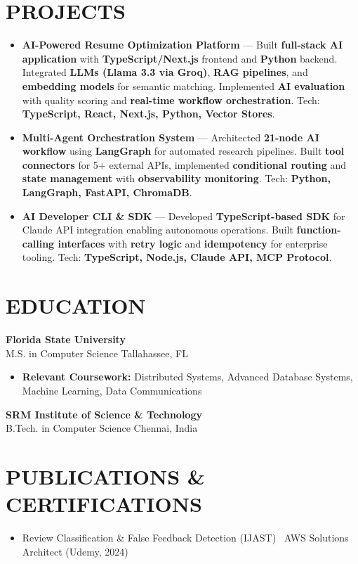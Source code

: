 \documentclass[letterpaper,10pt]{article}
\newcommand{\resumeItem}[1]{\item\small #1}
\newcommand{\resumeSubheading}[4]{
  \vspace{6pt}
  \noindent
  \textbf{#1} \hfill {\footnotesize #2} \\
  [-1pt]
  \noindent
  \small #3 \hfill {\small #4}
  \vspace{3pt}
}
\newcommand{\resumeItemsStart}{\vspace{-2pt}\begin{itemize}}
\newcommand{\resumeItemsEnd}{\end{itemize}\vspace{6pt}}
\begin{document}
\section{\textcolor{metablue}{PROJECTS}}
\vspace{-8pt}
\begin{tcolorbox}[colback=white,colframe=metablue,boxrule=0.8pt,arc=2pt,left=4pt,right=4pt,top=2pt,bottom=2pt,before skip=0pt]
\begin{itemize}
\resumeItem{\textbf{AI-Powered Resume Optimization Platform} --- Built \textbf{full-stack AI application} with \textbf{TypeScript/Next.js} frontend and \textbf{Python} backend. Integrated \textbf{LLMs (Llama 3.3 via Groq)}, \textbf{RAG pipelines}, and \textbf{embedding models} for semantic matching. Implemented \textbf{AI evaluation} with quality scoring and \textbf{real-time workflow orchestration}. Tech: \textbf{TypeScript, React, Next.js, Python, Vector Stores}.}

\resumeItem{\textbf{Multi-Agent Orchestration System} --- Architected \textbf{21-node AI workflow} using \textbf{LangGraph} for automated research pipelines. Built \textbf{tool connectors} for 5+ external APIs, implemented \textbf{conditional routing} and \textbf{state management} with \textbf{observability monitoring}. Tech: \textbf{Python, LangGraph, FastAPI, ChromaDB}.}

\resumeItem{\textbf{AI Developer CLI \& SDK} --- Developed \textbf{TypeScript-based SDK} for Claude API integration enabling autonomous operations. Built \textbf{function-calling interfaces} with \textbf{retry logic} and \textbf{idempotency} for enterprise tooling. Tech: \textbf{TypeScript, Node.js, Claude API, MCP Protocol}.}

\end{itemize}
\end{tcolorbox}
\vspace{-5pt}


\section{\textcolor{metablue}{EDUCATION}}
\vspace{-10pt}
\resumeSubheading
{Florida State University}{}
{M.S. in Computer Science}{Tallahassee, FL}
\resumeItemsStart
\resumeItem{\textbf{Relevant Coursework:} Distributed Systems, Advanced Database Systems, Machine Learning, Data Communications}
\resumeItemsEnd
\vspace{-5pt}
\resumeSubheading
{SRM Institute of Science \& Technology}{}
{B.Tech. in Computer Science}{Chennai, India}
\vspace{-10pt}

\section{\textcolor{metablue}{PUBLICATIONS \& CERTIFICATIONS}}
\vspace{-5pt}
\begin{itemize}
\resumeItem{Review Classification \& False Feedback Detection (IJAST) \textbar\ AWS Solutions Architect (Udemy, 2024)}
\end{itemize}
\end{document}
